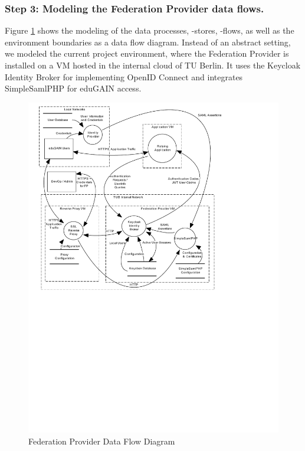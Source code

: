 \documentclass{llncs}
\begin{document}
\subsubsection{Step 3: Modeling the Federation Provider data flows.}

Figure \ref{fig:dataflow} shows the modeling of the data processes, -stores, -flows, as well as the environment boundaries as a data flow diagram. Instead of an abstract setting, we modeled the current project environment, where the Federation Provider is installed on a VM hosted in the internal cloud of TU Berlin. It uses the Keycloak Identity Broker for implementing OpenID Connect and integrates SimpleSamlPHP for eduGAIN access.
	
\begin{figure}
	\vspace*{-0.5cm}
	\centering
	\includegraphics[width=\columnwidth, clip=true, trim=0.9cm 12.4cm 5cm 0.3cm]{data_flow.pdf}
	\caption{Federation Provider Data Flow Diagram}
	\label{fig:dataflow}
\end{figure}
	
\end{document}
